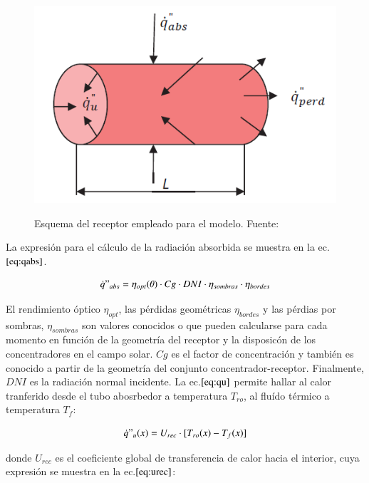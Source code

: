 \begin{figure}[H]
	\caption{Esquema del receptor empleado para el modelo. Fuente:\parencite{barberofresnoDesarrolloModeloTeorico2018}}
	\includegraphics[scale=0.8]{images/receptor_para_modelo.png}
	\label{fig:receptormodelo}
\end{figure}


La expresión para el cálculo de la radiación absorbida se muestra en la ec.\(\eqref{eq:qabs}\). 

\begin{equation}
    \dot{q}"_{abs}= \eta_{opt}(\theta) \cdot Cg \cdot DNI \cdot \eta_{sombras} \cdot \eta_{bordes} \label{eq:qabs}
\end{equation}

El rendimiento óptico \(\eta_{opt}\), las pérdidas geométricas \(\eta_{bordes}\) y las pérdias por sombras, \(\eta_{sombras}\) son valores conocidos o que pueden calcularse para cada momento en función de la geometría del receptor y la disposicón de los concentradores en el campo solar. \(Cg\) es el factor de concentración y también es conocido a partir de la geometría del conjunto concentrador-receptor. Finalmente, \(DNI\) es la radiación normal incidente. La ec.\(\eqref{eq:qu}\) permite hallar al calor tranferido desde el tubo abosrbedor a temperatura \(T_{ro}\), al fluído térmico a temperatura \(T_{f}\):

\begin{equation}
    \dot{q}"_{u}(x)= U_{rec} \cdot [T_{ro}(x)-T_{f}(x)] \label{eq:qu}
\end{equation}

donde \(U_{rec}\) es el coeficiente global de transferencia de calor hacia el interior, cuya expresión se muestra en la ec.\(\eqref{eq:urec}\):


